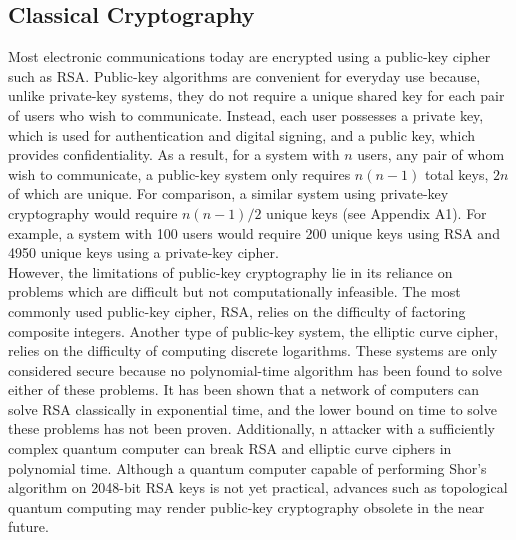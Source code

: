 \documentclass[conference]{IEEEtran}
\begin{document}
\subsection{Classical Cryptography}
Most electronic communications today are encrypted using a public-key cipher such as RSA\cite{Rivest}. Public-key algorithms are convenient for everyday use because, unlike private-key systems, they do not require a unique shared key for each pair of users who wish to communicate. Instead, each user possesses a private key, which is used for authentication and digital signing, and a public key, which provides confidentiality. As a result, for a system with $n$ users, any pair of whom wish to communicate, a public-key system only requires $n(n-1)$ total keys, $2n$ of which are unique. For comparison, a similar system using private-key cryptography would require $n(n-1)/2$ unique keys (see Appendix A1). For example, a system with 100 users would require 200 unique keys using RSA and 4950 unique keys using a private-key cipher.\\

However, the limitations of public-key cryptography lie in its reliance on problems which are difficult but not computationally infeasible. The most commonly used public-key cipher, RSA, relies on the difficulty of factoring composite integers\cite{Rivest}. Another type of public-key system, the elliptic curve cipher, relies on the difficulty of computing discrete logarithms\cite{Rosing}. These systems are only considered secure because no polynomial-time algorithm has been found to solve either of these problems. It has been shown that a network of computers can solve RSA classically in exponential time\cite{Weisstein}, and the lower bound on time to solve these problems has not been proven. Additionally, n attacker with a sufficiently complex quantum computer can break RSA and elliptic curve ciphers in polynomial time\cite{Shor}. Although a quantum computer capable of performing Shor's algorithm on 2048-bit RSA keys is not yet practical, advances such as topological quantum computing may render public-key cryptography obsolete in the near future.\\
\end{document}
